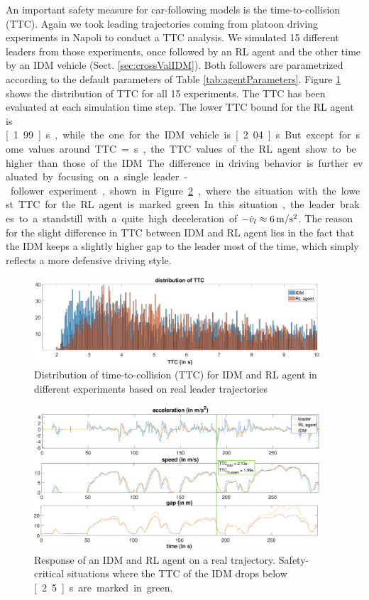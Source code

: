 \documentclass[review]{elsarticle}
\providecommand{\3}{{\ss}}
\begin{document}
	An important safety measure for car-following models is the
	time-to-collision (TTC). Again we took leading trajectories coming
	from platoon driving experiments in Napoli to conduct a TTC
	analysis. We simulated 15 different leaders from those experiments,
	once followed by an RL agent and the other time by an IDM vehicle (Sect. \ref{sec:crossValIDM}). Both
	followers are parametrized according to the default parameters of Table
	\ref{tab:agentParameters}. Figure \ref{fig:DistributionTTC} shows the
	distribution of TTC for all 15 experiments. The TTC has been evaluated
	at each simulation time step. The lower TTC bound for the RL agent is
	\unit[1.99]{s}, while the one for the IDM vehicle is
	\unit[2.04]{s}. But except for some values around TTC = \unit[2]{s}, the TTC values of the RL agent show to be higher than those of the IDM.
	
	The difference in driving behavior is further
	evaluated by focusing on a single leader-follower experiment, shown in
	Figure \ref{fig:TTC_CaseStudy}, where the situation with the lowest TTC for the RL agent is marked green. In this situation, the leader brakes to a standstill with a 
	quite high deceleration of $-\dot{v}_l \approx \unit[6]{m/s^2}$. The reason for the slight
	difference in TTC between IDM and RL agent lies in the fact that the
	IDM keeps a slightly higher gap to the leader most of the time,
	which simply reflects a more defensive driving style. 
	
	\begin{figure}	
		\centering
		\includegraphics[width=0.95\textwidth]{images/TTC}
		\caption{Distribution of time-to-collision (TTC) for IDM and RL agent in different experiments based on real leader trajectories}
		\label{fig:DistributionTTC}
	\end{figure}
	
	\begin{figure}	
		\centering
		\includegraphics[width=0.95\textwidth]{images/TTC_CaseStudy}
		\caption{Response of an IDM and RL agent on a real trajectory. Safety-critical situations where the TTC of the IDM drops below \unit[2.5]{s} are marked in green.}
		\label{fig:TTC_CaseStudy}
	\end{figure}
	
\end{document}
